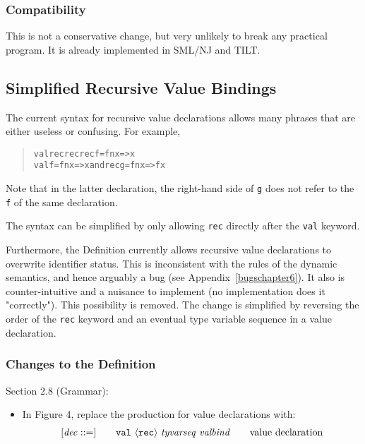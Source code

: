 \documentclass[twoside,titlepage]{article}
\begin{document}
\begin{appendix}
\subsubsection*{Compatibility}

This is not a conservative change, but very unlikely to break any practical program. It is already implemented in SML/NJ and TILT.


\subsection{Simplified Recursive Value Bindings}
\label{ext-recursive}

The current syntax for recursive value declarations allows many phrases that are either useless or confusing. For example,
\begin{quote}
\begin{alltt}
val rec rec rec f = fn x => x
val f = fn x => x and rec g = fn x => f x
\end{alltt}
\end{quote}
Note that in the latter declaration, the right-hand side of {\tt g} does not refer to the {\tt f} of the same declaration.

The syntax can be simplified by only allowing {\tt rec} directly after the {\tt val} keyword.

Furthermore, the Definition currently allows recursive value declarations to overwrite identifier status. This is inconsistent with the rules of the dynamic semantics, and hence arguably a bug (see Appendix~\ref{bugschapter6}). It also is counter-intuitive and a nuisance to implement (no implementation does it "correctly"). This possibility is removed.
The change is simplified by reversing the order of the {\tt rec} keyword and an eventual type variable sequence in a value declaration.

\subsubsection*{Changes to the Definition}

Section 2.8 (Grammar):
\begin{itemize}
\item In Figure 4, replace the production for value declarations with:
  $$
  \begin{array}{l@{\qquad}l@{\qquad}l}
  [\mathit{dec} ::=] & {\tt{val}}~\langle{\tt{rec}}\rangle~\mathit{tyvarseq}~\mathit{valbind} & \textrm{value declaration}
  \end{array}
  $$


\end{itemize}
\end{appendix}
\end{document}
